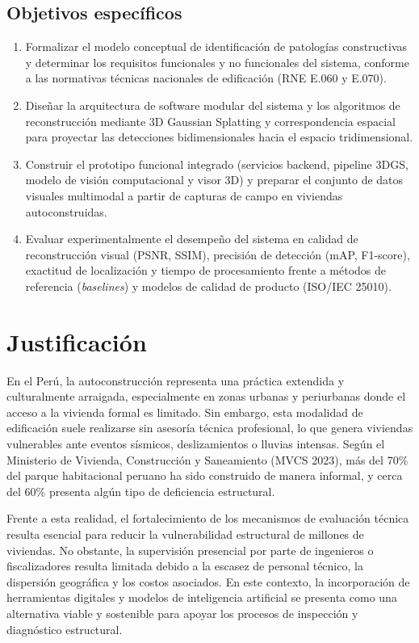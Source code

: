 \documentclass[12pt,oneside]{report}
\begin{document}
\subsection{Objetivos específicos}
\begin{enumerate}
  \item Formalizar el modelo conceptual de identificación de patologías constructivas y determinar los requisitos funcionales y no funcionales del sistema, conforme a las normativas técnicas nacionales de edificación (RNE E.060 y E.070).
  \item Diseñar la arquitectura de software modular del sistema y los algoritmos de reconstrucción mediante 3D Gaussian Splatting y correspondencia espacial para proyectar las detecciones bidimensionales hacia el espacio tridimensional.
  \item Construir el prototipo funcional integrado (servicios backend, pipeline 3DGS, modelo de visión computacional y visor 3D) y preparar el conjunto de datos visuales multimodal a partir de capturas de campo en viviendas autoconstruidas.
  \item Evaluar experimentalmente el desempeño del sistema en calidad de reconstrucción visual (PSNR, SSIM), precisión de detección (mAP, F1-score), exactitud de localización y tiempo de procesamiento frente a métodos de referencia (\textit{baselines}) y modelos de calidad de producto (ISO/IEC 25010).
\end{enumerate}

\section{Justificación}
En el Perú, la autoconstrucción representa una práctica extendida y culturalmente arraigada, especialmente en zonas urbanas y periurbanas donde el acceso a la vivienda formal es limitado. Sin embargo, esta modalidad de edificación suele realizarse sin asesoría técnica profesional, lo que genera viviendas vulnerables ante eventos sísmicos, deslizamientos o lluvias intensas. Según el Ministerio de Vivienda, Construcción y Saneamiento (MVCS 2023), más del 70\% del parque habitacional peruano ha sido construido de manera informal, y cerca del 60\% presenta algún tipo de deficiencia estructural.\par

Frente a esta realidad, el fortalecimiento de los mecanismos de evaluación técnica resulta esencial para reducir la vulnerabilidad estructural de millones de viviendas. No obstante, la supervisión presencial por parte de ingenieros o fiscalizadores resulta limitada debido a la escasez de personal técnico, la dispersión geográfica y los costos asociados. En este contexto, la incorporación de herramientas digitales y modelos de inteligencia artificial se presenta como una alternativa viable y sostenible para apoyar los procesos de inspección y diagnóstico estructural.\par
\end{document}
